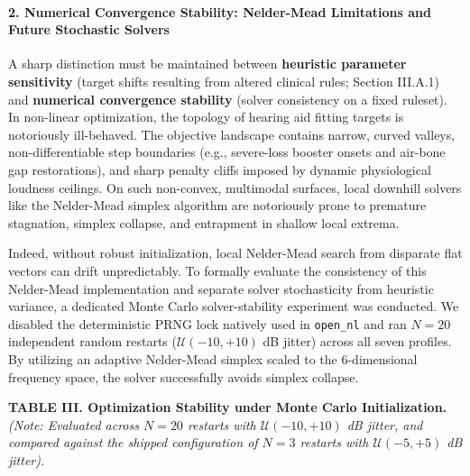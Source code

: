 \documentclass[
  12pt,
]{article}
\begin{document}
\paragraph{2. Numerical Convergence Stability: Nelder-Mead Limitations
and Future Stochastic
Solvers}\label{numerical-convergence-stability-nelder-mead-limitations-and-future-stochastic-solvers}

A sharp distinction must be maintained between \textbf{heuristic
parameter sensitivity} (target shifts resulting from altered clinical
rules; Section III.A.1) and \textbf{numerical convergence stability}
(solver consistency on a fixed ruleset). In non-linear optimization, the
topology of hearing aid fitting targets is notoriously ill-behaved. The
objective landscape contains narrow, curved valleys, non-differentiable
step boundaries (e.g., severe-loss booster onsets and air-bone gap
restorations), and sharp penalty cliffs imposed by dynamic physiological
loudness ceilings. On such non-convex, multimodal surfaces, local
downhill solvers like the Nelder-Mead simplex algorithm are notoriously
prone to premature stagnation, simplex collapse, and entrapment in
shallow local extrema.

Indeed, without robust initialization, local Nelder-Mead search from
disparate flat vectors can drift unpredictably. To formally evaluate the
consistency of this Nelder-Mead implementation and separate solver
stochasticity from heuristic variance, a dedicated Monte Carlo
solver-stability experiment was conducted. We disabled the deterministic
PRNG lock natively used in \texttt{open\_nl} and ran \(N=20\)
independent random restarts (\(\mathcal{U}(-10, +10)\) dB jitter) across
all seven profiles. By utilizing an adaptive Nelder-Mead simplex scaled
to the 6-dimensional frequency space, the solver successfully avoids
simplex collapse.

\textbf{TABLE III. Optimization Stability under Monte Carlo
Initialization.} \emph{(Note: Evaluated across \(N=20\) restarts with
\(\mathcal{U}(-10, +10)\) dB jitter, and compared against the shipped
configuration of \(N=3\) restarts with \(\mathcal{U}(-5, +5)\) dB
jitter).}
\end{document}
